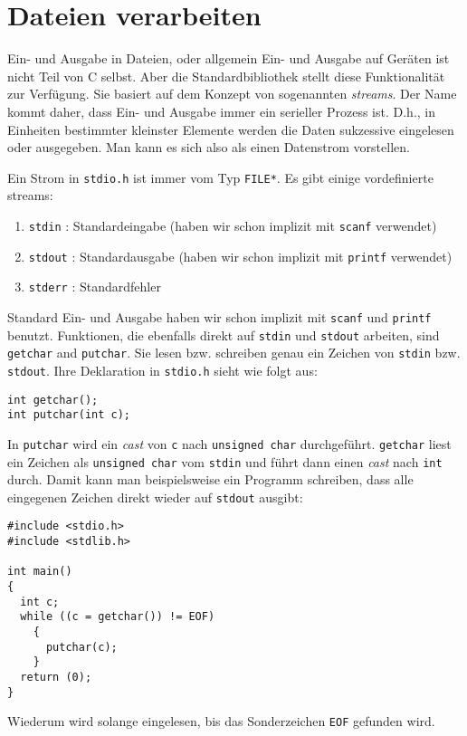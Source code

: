 \section{Dateien verarbeiten}

Ein- und Ausgabe in Dateien, oder allgemein Ein- und Ausgabe auf Geräten ist nicht Teil von C selbst.
Aber die Standardbibliothek stellt diese Funktionalität zur Verfügung.
Sie basiert auf dem Konzept von sogenannten \emph{streams}.
Der Name kommt daher, dass Ein- und Ausgabe immer ein serieller Prozess ist.
D.h., in Einheiten bestimmter kleinster Elemente werden die Daten sukzessive eingelesen oder ausgegeben.
Man kann es sich also als einen Datenstrom vorstellen.

Ein Strom in \verb|stdio.h| ist immer vom Typ \verb|FILE*|.
Es gibt einige vordefinierte streams:
\begin{enumerate}
\item \verb|stdin| : Standardeingabe (haben wir schon implizit mit \texttt{scanf} verwendet) 
\item \texttt{stdout} : Standardausgabe (haben wir schon implizit mit \texttt{printf} verwendet) 
\item \texttt{stderr} : Standardfehler
\end{enumerate} 
Standard Ein- und Ausgabe haben wir schon implizit mit \texttt{scanf} und \texttt{printf} benutzt.
Funktionen, die ebenfalls direkt auf \verb|stdin| und \texttt{stdout} arbeiten, sind \verb|getchar| and \verb|putchar|.
Sie lesen bzw. schreiben genau ein Zeichen von \verb|stdin| bzw. \texttt{stdout}.
Ihre Deklaration in \verb|stdio.h| sieht wie folgt aus:
\begin{lstlisting}
int getchar();
int putchar(int c);
\end{lstlisting}
In \verb|putchar| wird ein \emph{cast} von \verb|c| nach \verb|unsigned char| durchgeführt.
\verb|getchar| liest ein Zeichen als \verb|unsigned char| vom \verb|stdin| und führt dann einen \emph{cast} nach \verb|int| durch.
Damit kann man beispielsweise ein Programm schreiben, dass alle eingegenen Zeichen direkt wieder auf \texttt{stdout} ausgibt:
\begin{lstlisting}
#include <stdio.h>
#include <stdlib.h>

int main()
{
  int c;
  while ((c = getchar()) != EOF)
    {
      putchar(c);
    }
  return (0);
}
\end{lstlisting}
Wiederum wird solange eingelesen, bis das Sonderzeichen \verb|EOF| gefunden wird.

